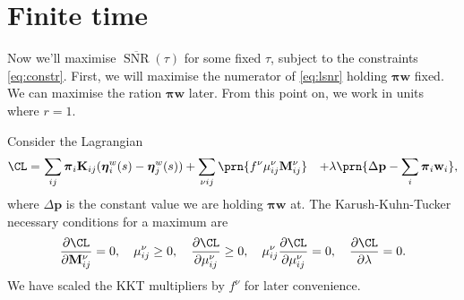 \documentclass[12pt]{article}
\newcommand{\pr}{\mathbf{p}}
\newcommand{\eq}{\pib}
\newcommand{\pib}{\boldsymbol{\pi}}
\newcommand{\etw}{\boldsymbol{\eta}^w}
\newcommand{\w}{\mathbf{w}}
\newcommand{\M}{\mathbf{M}}
\newcommand{\enc}{\mathbf{K}}
\DeclareMathOperator{\snr}{SNR}
\newcommand{\snrb}{\overline{\snr}}
\renewcommand{\pdiff}[2]{\frac{\partial #1}{\partial #2}}
\begin{document}
\section{Finite time}\label{sec:finite}

Now we'll maximise $\snrb(\tau)$ for some fixed $\tau$, subject to the constraints \eqref{eq:constr}.
First, we will maximise the numerator of \eqref{eq:lsnr} holding $\eq\w$ fixed.
We can maximise the ration \wrt $\eq\w$ later.
From this point on, we work in units where \(r = 1\).

Consider the Lagrangian
%
\begin{equation}\label{eq:finitelagrangian}
\begin{aligned}
  \CL =&\, \sum_{ij} \eq_i \enc_{ij} (\etw_i(s) - \etw_j(s))
        +\sum_{\nu i j} \prn{ f^\nu \mu^\nu_{ij} \M^\nu_{ij} }
        &+ \lambda \prn{ \Delta\pr - \sum_i \eq_i \w_i },
\end{aligned}
\end{equation}
%
where $\Delta\pr$ is the constant value we are holding $\eq\w$ at.
The Karush-Kuhn-Tucker necessary conditions for a maximum are
%
\begin{equation}\label{eq:KTfinite}
  \pdiff{\CL}{\M^\nu_{ij}} = 0, \quad
  \mu^\nu_{ij} \geq 0, \quad
  \pdiff{\CL}{\mu^\nu_{ij}} \geq 0, \quad
  \mu^\nu_{ij}\pdiff{\CL}{\mu^\nu_{ij}} = 0, \quad
  \pdiff{\CL}{\lambda} = 0.
\end{equation}
%
We have scaled the KKT multipliers by \(f^\nu\) for later convenience.
\end{document}
